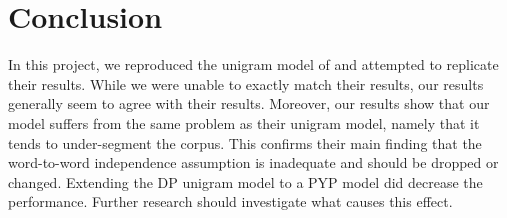 \section{Conclusion}

In this project, we reproduced the unigram model of \cite{Goldwater200921} and attempted to replicate their results. While we were unable to exactly match their results, our results generally seem to agree with their results. Moreover, our results show that our model suffers from the same problem as their unigram model, namely that it tends to under-segment the corpus. This confirms their main finding that the word-to-word independence assumption is inadequate and should be dropped or changed.
Extending the DP unigram model to a PYP model did decrease the performance. Further research should investigate what causes this effect.
